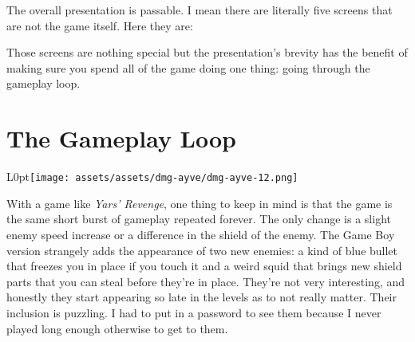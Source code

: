 \documentclass{book}
\begin{document}
The overall presentation is passable. I mean there are literally five screens that are not the game itself. Here they are:\par
\FloatBarrier\vspace{\baselineskip}\centering
\begin{minipage}{0.45\linewidth}\end{minipage}\vspace{2pt}
\begin{minipage}{0.45\linewidth}\end{minipage}\vspace{2pt}
\begin{minipage}{0.45\linewidth}\end{minipage}\vspace{2pt}
\begin{minipage}{0.45\linewidth}\end{minipage}\vspace{2pt}
\begin{minipage}{0.45\linewidth}\end{minipage}
\par\justifying
Those screens are nothing special but the presentation’s brevity has the benefit of making sure you spend all of the game doing one thing: going through the gameplay loop.\par
\FloatBarrier\section*{The Gameplay Loop}
\begin{wrapfigure}{L}{0pt}{\texttt{[image: assets/assets/dmg-ayve/dmg-ayve-12.png]}}\end{wrapfigure}\noindent
With a game like \emph{Yars’ Revenge}, one thing to keep in mind is that the game is the same short burst of gameplay repeated forever. The only change is a slight enemy speed increase or a difference in the shield of the enemy. The Game Boy version strangely adds the appearance of two new enemies: a kind of blue bullet that freezes you in place if you touch it and a weird squid that brings new shield parts that you can steal before they’re in place. They’re not very interesting, and honestly they start appearing so late in the levels as to not really matter. Their inclusion is puzzling. I had to put in a password to see them because I never played long enough otherwise to get to them.\par
\end{document}

